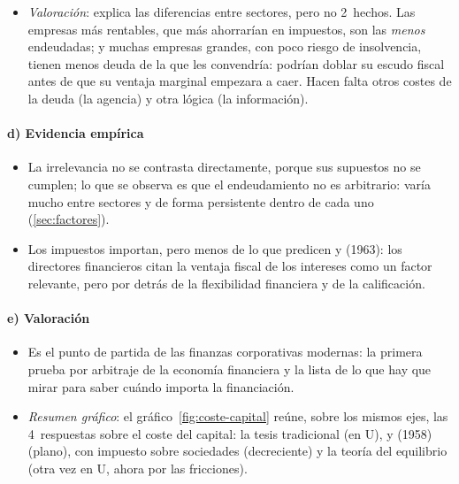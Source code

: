 \documentclass[11pt]{article}
\begin{document}
\begin{itemize}
\item \emph{Valoración}: explica las diferencias entre sectores, pero no 2~hechos. Las empresas más rentables, que más ahorrarían en impuestos, son las \emph{menos} endeudadas; y muchas empresas grandes, con poco riesgo de insolvencia, tienen menos deuda de la que les convendría: podrían doblar su escudo fiscal antes de que su ventaja marginal empezara a caer\nocite{Graham2000HowBig}. Hacen falta otros costes de la deuda (la agencia) y otra lógica (la información).
\end{itemize}

\paragraph{d) Evidencia empírica}

\begin{itemize}
\item La irrelevancia no se contrasta directamente, porque sus supuestos no se cumplen; lo que se observa es que el endeudamiento no es arbitrario: varía mucho entre sectores y de forma persistente dentro de cada uno\nocite{RajanZingales1995What,FrankGoyal2009Capital} (\ref{sec:factores}).
\item Los impuestos importan, pero menos de lo que predicen  y  (1963): los directores financieros citan la ventaja fiscal de los intereses como un factor relevante, pero por detrás de la flexibilidad financiera y de la calificación\nocite{GrahamHarvey2001Theory}.
\end{itemize}

\paragraph{e) Valoración}

\begin{itemize}
\item Es el punto de partida de las finanzas corporativas modernas: la primera prueba por arbitraje de la economía financiera y la lista de lo que hay que mirar para saber cuándo importa la financiación.
\item \emph{Resumen gráfico}: el gráfico~\ref{fig:coste-capital} reúne, sobre los mismos ejes, las 4~respuestas sobre el coste del capital: la tesis tradicional (en U),  y  (1958) (plano), con impuesto sobre sociedades (decreciente) y la teoría del equilibrio (otra vez en U, ahora por las fricciones).
\end{itemize}
\end{document}
